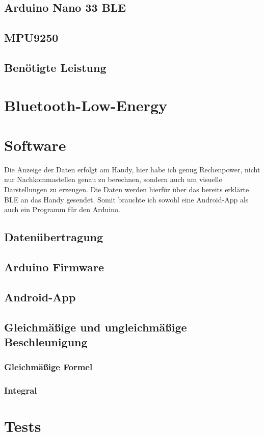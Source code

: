 \documentclass[11pt, titlepage]{scrreprt}
\begin{document}
\section{Arduino Nano 33 BLE}

\section{MPU9250}

\section{Benötigte Leistung}


\chapter{Bluetooth-Low-Energy}




\chapter{Software}
Die Anzeige der Daten erfolgt am Handy, hier habe ich genug Rechenpower,
nicht nur Nachkommastellen genau zu berechnen, sondern auch um 
visuelle Darstellungen zu erzeugen. Die Daten werden hierfür über das bereits
erklärte BLE an das Handy gesendet.
Somit brauchte ich sowohl eine Android-App als auch ein Programm für den Arduino.
\section{Datenübertragung}

\section{Arduino Firmware}

\section{Android-App}

\section{Gleichmäßige und ungleichmäßige Beschleunigung}

\subsection{Gleichmäßige Formel}

\subsection{Integral}

\chapter{Tests}

%
%






\end{document}
